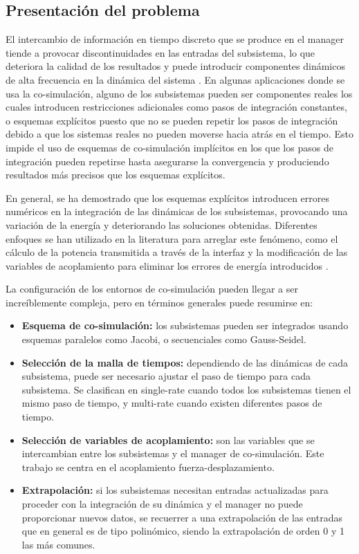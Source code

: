 \subsection{Presentación del problema}
\label{sec:problema}

El intercambio de información en tiempo discreto que se produce en el manager tiende a provocar discontinuidades en las entradas del subsistema, lo que deteriora la calidad de los resultados y puede introducir componentes dinámicos de alta frecuencia en la dinámica del sistema \cite{Benedikt2013}.
En algunas aplicaciones donde se usa la co-simulación, alguno de los subsistemas pueden ser componentes reales los cuales introducen restricciones adicionales como pasos de integración constantes, o esquemas explícitos puesto que no se pueden repetir los pasos de integración debido a que los sistemas reales no pueden moverse hacia atrás en el tiempo.
Esto impide el uso de esquemas de co-simulación implícitos en los que los pasos de integración pueden repetirse hasta asegurarse la convergencia y produciendo resultados más precisos que los esquemas explícitos.

En general, se ha demostrado que los esquemas explícitos introducen errores numéricos en la integración de las dinámicas de los subsistemas, provocando una variación de la energía y deteriorando las soluciones obtenidas.
Diferentes enfoques se han utilizado en la literatura para arreglar este fenómeno, como el cálculo de  la potencia transmitida a través de la interfaz y la modificación de las variables de acoplamiento para eliminar los errores de energía introducidos \cite{Sadjina2017, Rodriguez2022}.

La configuración de los entornos de co-simulación pueden llegar a ser increíblemente compleja, pero en términos generales puede resumirse en:
%
\begin{itemize}
    \item \textbf{Esquema de co-simulación:} los subsistemas pueden ser integrados usando esquemas paralelos como Jacobi, o secuenciales como Gauss-Seidel.  
    \item \textbf{Selección de la malla de tiempos:} dependiendo de las dinámicas de cada subsistema, puede ser necesario ajustar el paso de tiempo para cada subsistema. Se clasifican en single-rate cuando todos los subsistemas tienen el mismo paso de tiempo, y multi-rate cuando existen diferentes pasos de tiempo.
    \item \textbf{Selección de variables de acoplamiento:} son las variables que se intercambian entre los subsistemas y el manager de co-simulación. Este trabajo se centra en el acoplamiento fuerza-desplazamiento.
    \item \textbf{Extrapolación:} si los subsistemas necesitan entradas actualizadas para proceder con la integración de su dinámica y el manager no puede proporcionar nuevos datos, se recuerrer a una extrapolación de las entradas que en general es de tipo polinómico, siendo la extrapolación de orden 0 y 1 las más comunes.
\end{itemize}